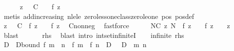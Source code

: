 \begin{isabellebody}
\ \ \ \ \isamarkupfalse%
\ {\isachardoublequoteopen}{\isasymexists}z\ {\isasymge}\ {}{\isachardot}{\kern0pt}\ {\isacharparenleft}{\kern0pt}C\ {\isacharplus}{\kern0pt}\ {}{\isacharparenright}{\kern0pt}\ {\isasymle}\ f\ z{\isachardoublequoteclose}\ \isamarkupfalse%
\ {\isacharparenleft}{\kern0pt}metis\ add{\isacharunderscore}{\kern0pt}increasing{}\ nle{\isacharunderscore}{\kern0pt}le\ zero{\isacharunderscore}{\kern0pt}less{\isacharunderscore}{\kern0pt}one{\isacharunderscore}{\kern0pt}class{\isachardot}{\kern0pt}zero{\isacharunderscore}{\kern0pt}le{\isacharunderscore}{\kern0pt}one\ pos\ pos{\isacharunderscore}{\kern0pt}def{\isacharparenright}{\kern0pt}\isanewline
\ \ \ \ \isamarkupfalse%
\ {\isachardoublequoteopen}{\isasymexists}z\ {\isasymge}\ {}{\isachardot}{\kern0pt}\ C\ {\isasymle}\ f\ z\ {\isasymand}\ {}\ {\isacharless}{\kern0pt}\ f\ z{\isachardoublequoteclose}\ \isamarkupfalse%
\ C{\isacharunderscore}{\kern0pt}nonneg\ \isamarkupfalse%
\ fastforce\isanewline
\ \ \ \ \isamarkupfalse%
\ {\isachardoublequoteopen}{\isasymexists}N{\isasymge}C{\isachardot}{\kern0pt}\ {\isasymexists}z{\isachardot}{\kern0pt}\ N\ {\isacharequal}{\kern0pt}\ f\ z\ {\isasymand}\ {}\ {\isacharless}{\kern0pt}\ f\ z\ {\isasymand}\ {}\ {\isasymle}\ z{\isachardoublequoteclose}\ \isamarkupfalse%
\ blast\isanewline
\ \ \isacommand{{\isacharbraceright}{\kern0pt}}\isamarkupfalse%
\isanewline
\ \ \isamarkupfalse%
\ {\isacharquery}{\kern0pt}rhs\ \isamarkupfalse%
\ {\isacharparenleft}{\kern0pt}blast\ intro{\isacharbang}{\kern0pt}{\isacharcolon}{\kern0pt}\ int{\isacharunderscore}{\kern0pt}set{\isacharunderscore}{\kern0pt}infiniteI{\isacharparenright}{\kern0pt}\isanewline
{}\isamarkupfalse%
\isanewline
\ \ \isamarkupfalse%
\ infinite{\isacharcolon}{\kern0pt}\ {\isacharquery}{\kern0pt}rhs\isanewline
\ \ \isamarkupfalse%
\ \isamarkupfalse%
\ D\ \ D{\isacharunderscore}{\kern0pt}bound{\isacharcolon}{\kern0pt}\ {\isachardoublequoteopen}{\isasymbar}f\ {\isacharparenleft}{\kern0pt}m\ {\isacharplus}{\kern0pt}\ n{\isacharparenright}{\kern0pt}\ {\isacharminus}{\kern0pt}\ {\isacharparenleft}{\kern0pt}f\ m\ {\isacharplus}{\kern0pt}\ f\ n{\isacharparenright}{\kern0pt}{\isasymbar}\ {\isacharless}{\kern0pt}\ D{\isachardoublequoteclose}\ {\isachardoublequoteopen}{}\ {\isacharless}{\kern0pt}\ D{\isachardoublequoteclose}\ \ m\ n\ \isamarkupfalse%

\end{isabellebody}
